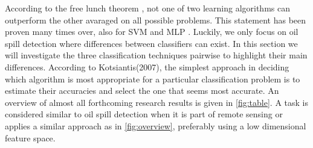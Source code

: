  
According to the free lunch theorem \cite{wolpert1995no}, not one of two learning algorithms can outperform the other avaraged on all possible problems. This statement has been proven many times over, also for SVM and MLP \cite{Moavenian20103088,Zanaty2012177,jin2005neural}. Luckily, we only focus on oil spill detection where differences between classifiers can exist. In this section we will investigate the three classification techniques pairwise to highlight their main differences. According to Kotsiantis(2007), the simplest approach in deciding which algorithm is most appropriate for a particular classification problem is to estimate their accuracies and select the one that seems most accurate\cite{kotsiantis2007supervised}. An overview of almost all forthcoming research results is given in \ref{fig:table}. A task is considered similar to oil spill detection when it is part of remote sensing or applies a similar approach as in \ref{fig:overview}, preferably using a low dimensional feature space.